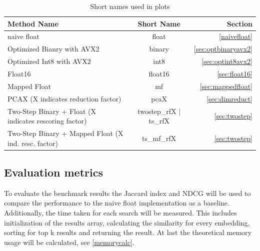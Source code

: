 \begin{table}[h]
    \centering
    \begin{tabular}{lcr}
        \toprule
        Method Name                                                          & Short Name             & Section                     \\
        \midrule
        naive float                                                          & float                  & \autoref{naivefloat}        \\
        Optimized Bianry with AVX2                                           & binary                 & \autoref{sec:optbinaryavx2} \\
        Optimized Int8 with AVX2                                             & int8                   & \autoref{sec:optint8avx2}   \\
        Float16                                                              & float16                & \autoref{sec:float16}       \\
        Mapped Float                                                         & mf                     & \autoref{sec:mappedfloat}   \\
        PCAX (X indicates reduction factor)                                  & pcaX                   & \autoref{sec:dimreduct}     \\
        \footnotesize Two-Step Binary + Float (X indicates rescoring factor) & twostep\_rfX | ts\_rfX & \autoref{sec:twostep}       \\
        \footnotesize Two-Step Binary + Mapped Float (X ind. resc. factor)   & ts\_mf\_rfX            & \autoref{sec:twostep}       \\
        \bottomrule
    \end{tabular}
    \caption{Short names used in plots}
    \label{shortnames}
\end{table}

\subsection{Evaluation metrics}
To evaluate the benchmark results the Jaccard index and NDCG will be used to compare the performance to the naive float implementation as a baseline. Additionally, the time taken for each search will be measured. This includes initialization of the results array, calculating the similarity for every embedding, sorting for top k results and returning the result. At last the theoretical memory usage will be calculated, see \autoref{memorycalc}.

